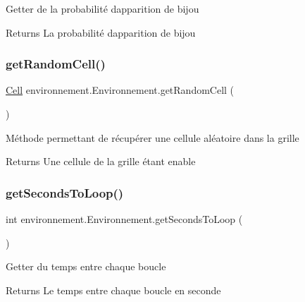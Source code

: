 Getter de la probabilité d\textquotesingle{}apparition de bijou \begin{DoxyReturn}{Returns}
La probabilité d\textquotesingle{}apparition de bijou 
\end{DoxyReturn}
\hypertarget{classenvironnement_1_1_environnement_aa11c05d0dd261136c31224419ecb037a}{}\label{classenvironnement_1_1_environnement_aa11c05d0dd261136c31224419ecb037a} 
\subsubsection{\texorpdfstring{get\+Random\+Cell()}{getRandomCell()}}
{\footnotesize\ttfamily \hyperlink{classenvironnement_1_1_cell}{Cell} environnement.\+Environnement.\+get\+Random\+Cell (\begin{DoxyParamCaption}{ }\end{DoxyParamCaption})}

Méthode permettant de récupérer une cellule aléatoire dans la grille \begin{DoxyReturn}{Returns}
Une cellule de la grille étant enable 
\end{DoxyReturn}
\hypertarget{classenvironnement_1_1_environnement_a93730fe27fd562b41e84c6ae7272c2f1}{}\label{classenvironnement_1_1_environnement_a93730fe27fd562b41e84c6ae7272c2f1} 
\subsubsection{\texorpdfstring{get\+Seconds\+To\+Loop()}{getSecondsToLoop()}}
{\footnotesize\ttfamily int environnement.\+Environnement.\+get\+Seconds\+To\+Loop (\begin{DoxyParamCaption}{ }\end{DoxyParamCaption})}

Getter du temps entre chaque boucle \begin{DoxyReturn}{Returns}
Le temps entre chaque boucle en seconde 
\end{DoxyReturn}
\hypertarget{classenvironnement_1_1_environnement_a5b7c3fb51c2af94754725667c9a34098}{}\label{classenvironnement_1_1_environnement_a5b7c3fb51c2af94754725667c9a34098} 
